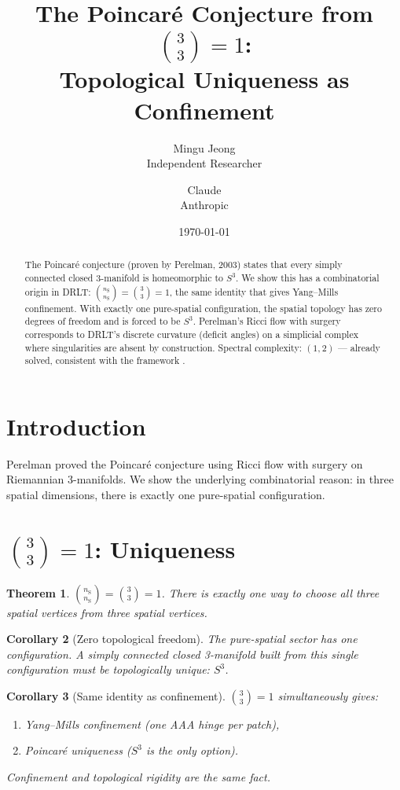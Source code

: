 \documentclass[12pt]{article}
\title{The Poincar\'e Conjecture from $\binom{3}{3} = 1$:\\
  Topological Uniqueness as Confinement}
\author{Mingu Jeong\\Independent Researcher
\and Claude\\Anthropic}
\date{\today}
\newtheorem{theorem}{Theorem}[section]
\newtheorem{corollary}[theorem]{Corollary}
\theoremstyle{remark}
\newcommand{\nS}{n_{\mathrm{S}}}
\begin{document}
\maketitle

\begin{abstract}
The Poincar\'e conjecture (proven by Perelman, 2003)
states that every simply connected closed 3-manifold is
homeomorphic to $S^3$. We show this has a combinatorial
origin in DRLT: $\binom{\nS}{\nS} = \binom{3}{3} = 1$,
the same identity that gives Yang--Mills confinement.
With exactly one pure-spatial configuration, the spatial
topology has zero degrees of freedom and is forced to
be $S^3$. Perelman's Ricci flow with surgery corresponds
to DRLT's discrete curvature (deficit angles) on a
simplicial complex where singularities are absent by
construction. Spectral complexity: $(1, 2)$ ---
already solved, consistent with the framework \cite{Paper9}.
\end{abstract}

\section{Introduction}

Perelman proved the Poincar\'e conjecture using Ricci flow
with surgery on Riemannian 3-manifolds. We show the
underlying combinatorial reason: in three spatial dimensions,
there is exactly one pure-spatial configuration.

\section{$\binom{3}{3} = 1$: Uniqueness}

\begin{theorem}
$\binom{\nS}{\nS} = \binom{3}{3} = 1$. There is exactly
one way to choose all three spatial vertices from three
spatial vertices.
\end{theorem}

\begin{corollary}[Zero topological freedom]
The pure-spatial sector has one configuration. A simply
connected closed 3-manifold built from this single
configuration must be topologically unique: $S^3$.
\end{corollary}

\begin{corollary}[Same identity as confinement]
$\binom{3}{3} = 1$ simultaneously gives:
\begin{enumerate}
\item Yang--Mills confinement (one AAA hinge per patch),
\item Poincar\'e uniqueness ($S^3$ is the only option).
\end{enumerate}
Confinement and topological rigidity are the same fact.
\end{corollary}
\end{document}
